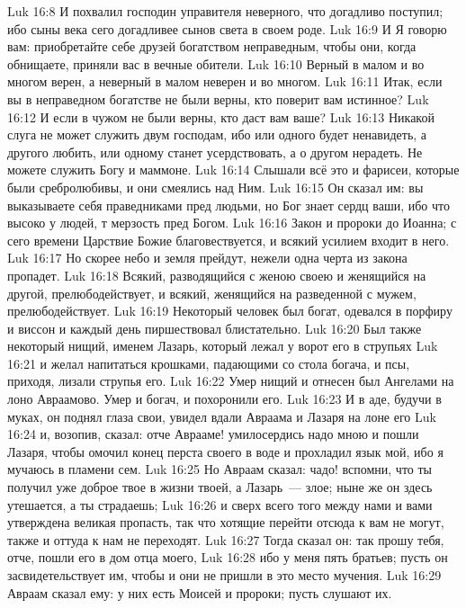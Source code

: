 \vs Luk 16:8 И похвалил господин управителя неверного, что догадливо поступил; ибо сыны века сего догадливее сынов света в своем роде.
\vs Luk 16:9 И Я говорю вам: приобретайте себе друзей богатством неправедным, чтобы они, когда обнищаете, приняли вас в вечные обители.
\vs Luk 16:10 Верный в малом и во многом верен, а неверный в малом неверен и во многом.
\vs Luk 16:11 Итак, если вы в неправедном богатстве не были верны, кто поверит вам истинное?
\vs Luk 16:12 И если в чужом не были верны, кто даст вам ваше?
\vs Luk 16:13 Никакой слуга не может служить двум господам, ибо или одного будет ненавидеть, а другого любить, или одному станет усердствовать, а о другом нерадеть. Не можете служить Богу и маммоне.
\rsbpar\vs Luk 16:14 Слышали всё это и фарисеи, которые были сребролюбивы, и они смеялись над Ним.
\vs Luk 16:15 Он сказал им: вы выказываете себя праведниками пред людьми, но Бог знает сердц ваши, ибо что высоко у людей, т мерзость пред Богом.
\vs Luk 16:16 Закон и пророки до Иоанна; с сего времени Царствие Божие благовествуется, и всякий усилием входит в него.
\vs Luk 16:17 Но скорее небо и земля прейдут, нежели одна черта из закона пропадет.
\vs Luk 16:18 Всякий, разводящийся с женою своею и женящийся на другой, прелюбодействует, и всякий, женящийся на разведенной с мужем, прелюбодействует.
\rsbpar\vs Luk 16:19 Некоторый человек был богат, одевался в порфиру и виссон и каждый день пиршествовал блистательно.
\vs Luk 16:20 Был также некоторый нищий, именем Лазарь, который лежал у ворот его в струпьях
\vs Luk 16:21 и желал напитаться крошками, падающими со стола богача, и псы, приходя, лизали струпья его.
\vs Luk 16:22 Умер нищий и отнесен был Ангелами на лоно Авраамово. Умер и богач, и похоронили его.
\vs Luk 16:23 И в аде, будучи в муках, он поднял глаза свои, увидел вдали Авраама и Лазаря на лоне его
\vs Luk 16:24 и, возопив, сказал: отче Аврааме! умилосердись надо мною и пошли Лазаря, чтобы омочил конец перста своего в воде и прохладил язык мой, ибо я мучаюсь в пламени сем.
\vs Luk 16:25 Но Авраам сказал: чадо! вспомни, что ты получил уже доброе твое в жизни твоей, а Лазарь~--- злое; ныне же он здесь утешается, а ты страдаешь;
\vs Luk 16:26 и сверх всего того между нами и вами утверждена великая пропасть, так что хотящие перейти отсюда к вам не могут, также и оттуда к нам не переходят.
\vs Luk 16:27 Тогда сказал он: так прошу тебя, отче, пошли его в дом отца моего,
\vs Luk 16:28 ибо у меня пять братьев; пусть он засвидетельствует им, чтобы и они не пришли в это место мучения.
\vs Luk 16:29 Авраам сказал ему: у них есть Моисей и пророки; пусть слушают их.
